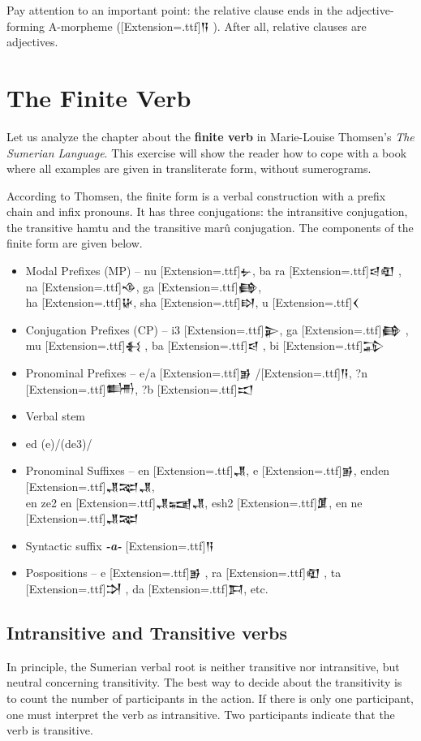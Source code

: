 \documentclass[a4paper,12pt]{book}
\newcommand{\fcn}{\setmainfont{Akkadian}[Extension=.ttf]}
\begin{document}
Pay attention to an important point:
the relative clause ends
in the adjective-forming A-morpheme ({\fcn 𒀀} ).
After all, relative clauses are adjectives.

\chapter{The Finite Verb}
Let us analyze the chapter about
the {\bf finite verb} in Marie-Louise
Thomsen's {\em The Sumerian Language}.
This exercise will show the reader
how to cope with a book where all
examples are given in transliterate
form, without sumerograms.

According to Thomsen, the finite form
is a verbal construction with a
prefix chain and infix pronouns.
It has three conjugations: the intransitive
conjugation, the transitive hamtu
and the transitive marû conjugation.
The components of the finite form
are given below.

\begin{itemize}
\item Modal Prefixes (MP) -- nu {\fcn 𒉡},
  ba ra {\fcn 𒁀𒊏} , na {\fcn 𒈾}, ga {\fcn 𒂵},\\
  ha {\fcn 𒄩}, sha {\fcn 𒊭}, u {\fcn 𒌋}
\item Conjugation Prefixes (CP) -- i3 {\fcn 𒉌},
  ga {\fcn 𒂵} , mu {\fcn 𒈬} , ba {\fcn 𒁀} , bi {\fcn 𒁉} 
\item Pronominal Prefixes -- e/a {\fcn 𒂊} /{\fcn 𒀀},
  ?n {\fcn 𒌦}, ?b {\fcn 𒀊}
\item Verbal stem
\item ed (e)/(de3)/
\item Pronominal Suffixes -- en {\fcn 𒂗},
  e {\fcn 𒂊}, enden {\fcn 𒂗𒉈𒂗},\\
  en ze2 en {\fcn 𒂗𒍢𒂗}, esh2 {\fcn 𒂠},
  en ne {\fcn 𒂗𒉈}
\item Syntactic suffix {\bf\em -a-} {\fcn 𒀀}
\item Pospositions -- e {\fcn 𒂊} , ra {\fcn 𒊏} ,
  ta {\fcn 𒋫} , da {\fcn 𒁕}, etc.
\end{itemize}

\section{Intransitive and Transitive verbs}
In principle, the Sumerian verbal root is
neither transitive nor intransitive,
but neutral concerning transitivity.
The best way to decide about the
transitivity is to count the number
of participants in the action.
If there is only one participant,
one must interpret the verb as
intransitive. Two participants
indicate that the verb is transitive.\\
\end{document}
